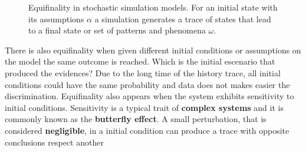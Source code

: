 \documentclass[11pt,oneside,a4paper,openright]{report}
\begin{document}
\begin{figure}[h]
\centering
\setlength\fboxsep{0pt}
\setlength\fboxrule{0.5pt}
\caption{Equifinality in stochastic simulation models. For an initial state 
	with its assumptions $\alpha$ a simulation generates a trace of states 
	that lead to a final state or set of patterns and phenomena $\omega$.}
\label{fig:Equifinality}
\end{figure}
%
There is also equifinality when given different initial conditions or assumptions on the model the same outcome is reached. Which is the initial escenario that produced the evidences? Due to the long time of the history trace, all initial conditions could have the same probability and data does not makes easier the discrimination. Equifinality also appears when the system exhibits sensitivity to initial conditions. Sensitivity is a typical trait of \textbf{complex systems} and it is commonly known as the \textbf{butterfly effect}. A small perturbation, that is considered \textbf{negligible}, in a initial condition can produce a trace with opposite conclusions respect another 
\end{document}
